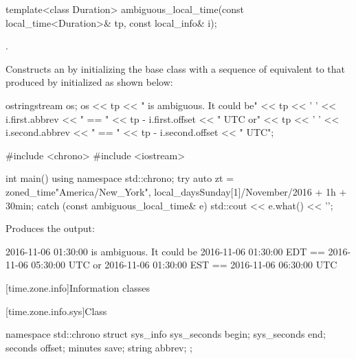 %
\begin{itemdecl}
template<class Duration>
  ambiguous_local_time(const local_time<Duration>& tp, const local_info& i);
\end{itemdecl}

\begin{itemdescr}
\pnum
\requires {}.

\pnum
\effects
Constructs an 
by initializing the base class with a sequence of 
equivalent to that produced by 
initialized as shown below:

\begin{codeblock}
ostringstream os;
os << tp << " is ambiguous.  It could be\n"
   << tp << ' ' << i.first.abbrev << " == "
   << tp - i.first.offset << " UTC or\n"
   << tp << ' ' << i.second.abbrev  << " == "
   << tp - i.second.offset  << " UTC";
\end{codeblock}

\pnum
\begin{example}
\begin{codeblock}
#include <chrono>
#include <iostream>

int main() {
  using namespace std::chrono;
  try {
    auto zt = zoned_time{"America/New_York",
                         local_days{Sunday[1]/November/2016} + 1h + 30min};
  } catch (const ambiguous_local_time& e) {
    std::cout << e.what() << '\n';
  }
}
\end{codeblock}

Produces the output:

\begin{codeblock}
2016-11-06 01:30:00 is ambiguous.  It could be
2016-11-06 01:30:00 EDT == 2016-11-06 05:30:00 UTC or
2016-11-06 01:30:00 EST == 2016-11-06 06:30:00 UTC
\end{codeblock}
\end{example}
\end{itemdescr}

[time.zone.info]{Information classes}

[time.zone.info.sys]{Class }

\begin{codeblock}
namespace std::chrono {
  struct sys_info {
    sys_seconds   begin;
    sys_seconds   end;
    seconds       offset;
    minutes       save;
    string        abbrev;
  };
}
\end{codeblock}

